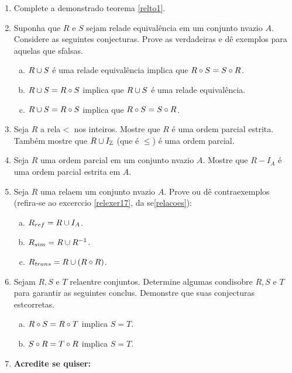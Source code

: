 \begin{enumerate}[{\bf 1.}]
\item Complete a demonstra\cao do teorema \ref{relto1}.

\item Suponha que $R$ e $S$ sejam rela\coes de equival\^encia em um conjunto n\ao vazio $A$. Considere as seguintes conjecturas. Prove as verdadeiras e d\^e exemplos para aquelas que s\ao falsas. 
\begin{enumerate}[a)]
\item $R\cup S$ \'e uma rela\cao de equival\^encia implica que $R\circ S=S\circ R$.
\item $R\cup S= R\circ S$ implica que $R\cup S$ \'e uma rela\cao de equival\^encia.
\item $R\cup S= R\circ S$ implica que $R\circ S=S\circ R$.
\end{enumerate}

\item Seja $R$ a rela\cao $<$ nos inteiros. Mostre que $R$ \'e uma ordem parcial estrita. Tamb\'em mostre que $R\cup I_{\mathbb{Z}}$ (que \'e $\leq$) \'e uma ordem parcial.

\item Seja $R$ uma ordem parcial em um conjunto n\ao vazio $A$. Mostre que $R-I_A$ \'e uma ordem parcial estrita em $A$.

\item Seja $R$ uma rela\cao em um conjunto n\ao vazio $A$. Prove ou d\^e contraexemplos (refira-se ao excerc\ih cio \ref{relexer17}, da se\cao \ref{relacoes}):
\begin{enumerate}[a)]
\item $R_{ref}=R\cup I_A$. 
\item $R_{sim}=R\cup R^{-1}$.
\item $R_{trans}=R\cup (R\circ R)$.
\end{enumerate}

\item Sejam $R,S$ e $T$ rela\coes entre conjuntos. Determine algumas condi\coes sobre $R,S$ e $T$ para garantir as seguintes conclus\ois. Demonstre que suas conjecturas est\ao corretas.
\begin{enumerate}[a)]
\item $R\circ S=R\circ T$ implica $S=T$.
\item $S\circ R=T\circ R$ implica $S=T$.
\end{enumerate}

\item {\bf Acredite se quiser:}  


\end{enumerate}
